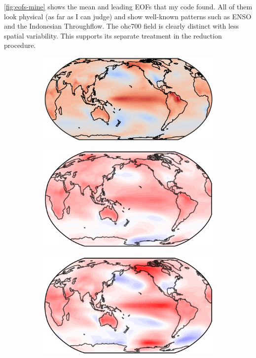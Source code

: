 \documentclass[parskip=half,DIV=16]{scrartcl}
\begin{document}
\cref{fig:eofs-mine} shows the mean and leading \glspl{EOF} that my code found. All of them look physical (as far as I can judge) and show well-known patterns such as ENSO and the Indonesian Throughflow. The ohc700 field is clearly distinct with less spatial variability. This supports its separate treatment in the reduction procedure.

\begin{figure}[h]
    \centering

    \begin{subfigure}[c]{0.3\textwidth}
        \includegraphics[width=\textwidth]{figures/eoftas_mine.png}
     \end{subfigure}
     \hfill
     \begin{subfigure}[c]{0.3\textwidth}
        \includegraphics[width=\textwidth]{figures/eoftas_ph17_mpi.png}
     \end{subfigure}
     \hfill
     \begin{subfigure}[c]{0.3\textwidth}
        \includegraphics[width=\textwidth]{figures/eoftas_ph17_ccsm.png}

\end{subfigure}
\end{figure}
\end{document}
